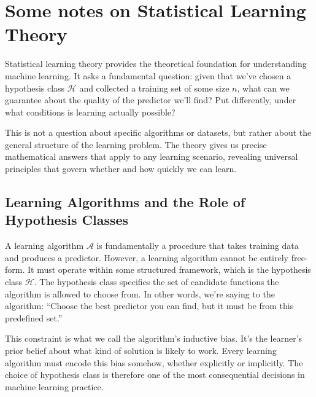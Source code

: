 %
%
%
%
%

\chapter{Some notes on Statistical Learning Theory}
\alert{Statistical learning theory} provides the theoretical foundation for understanding machine learning. It asks a fundamental question: given that we've chosen a hypothesis class $\mathcal{H}$ and collected a training set of some size $n$, what can we guarantee about the quality of the predictor we'll find? Put differently, under what conditions is learning actually possible?

This is not a question about specific algorithms or datasets, but rather about the general structure of the learning problem. The theory gives us precise mathematical answers that apply to any learning scenario, revealing universal principles that govern whether and how quickly we can learn.

\section*{Learning Algorithms and the Role of Hypothesis Classes}

A learning algorithm $\mathcal{A}$ is fundamentally a procedure that takes training data and produces a predictor. However, a learning algorithm cannot be entirely free-form. It must operate within some structured framework, which is the \alert{hypothesis class} $\mathcal{H}$. The hypothesis class specifies the set of candidate functions the algorithm is allowed to choose from. In other words, we're saying to the algorithm: ``Choose the best predictor you can find, but it must be from this predefined set.''

This constraint is what we call the algorithm's \alert{inductive bias}. It's the learner's prior belief about what kind of solution is likely to work. Every learning algorithm must encode this bias somehow, whether explicitly or implicitly. The choice of hypothesis class is therefore one of the most consequential decisions in machine learning practice.

